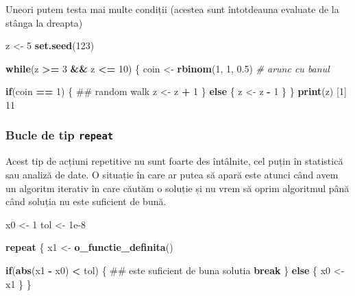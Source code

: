 \documentclass[]{article}
\newenvironment{Shaded}{\begin{snugshade}}{\end{snugshade}}
\newcommand{\KeywordTok}[1]{\textcolor[rgb]{0.13,0.29,0.53}{\textbf{#1}}}
\newcommand{\DecValTok}[1]{\textcolor[rgb]{0.00,0.00,0.81}{#1}}
\newcommand{\FloatTok}[1]{\textcolor[rgb]{0.00,0.00,0.81}{#1}}
\newcommand{\StringTok}[1]{\textcolor[rgb]{0.31,0.60,0.02}{#1}}
\newcommand{\CommentTok}[1]{\textcolor[rgb]{0.56,0.35,0.01}{\textit{#1}}}
\newcommand{\ControlFlowTok}[1]{\textcolor[rgb]{0.13,0.29,0.53}{\textbf{#1}}}
\newcommand{\OperatorTok}[1]{\textcolor[rgb]{0.81,0.36,0.00}{\textbf{#1}}}
\newcommand{\NormalTok}[1]{#1}
\newcounter{exo}[section]
\begin{document}
Uneori putem testa mai multe condiții (acestea sunt întotdeauna evaluate
de la stânga la dreapta)

\begin{Shaded}
\begin{Highlighting}[]
\NormalTok{z <-}\StringTok{ }\DecValTok{5}
\KeywordTok{set.seed}\NormalTok{(}\DecValTok{123}\NormalTok{)}

\ControlFlowTok{while}\NormalTok{(z }\OperatorTok{>=}\StringTok{ }\DecValTok{3} \OperatorTok{&&}\StringTok{ }\NormalTok{z }\OperatorTok{<=}\StringTok{ }\DecValTok{10}\NormalTok{) \{}
\NormalTok{        coin <-}\StringTok{ }\KeywordTok{rbinom}\NormalTok{(}\DecValTok{1}\NormalTok{, }\DecValTok{1}\NormalTok{, }\FloatTok{0.5}\NormalTok{) }\CommentTok{# arunc cu banul}
        
        \ControlFlowTok{if}\NormalTok{(coin }\OperatorTok{==}\StringTok{ }\DecValTok{1}\NormalTok{) \{  ## random walk}
\NormalTok{                z <-}\StringTok{ }\NormalTok{z }\OperatorTok{+}\StringTok{ }\DecValTok{1}
\NormalTok{        \} }\ControlFlowTok{else}\NormalTok{ \{}
\NormalTok{                z <-}\StringTok{ }\NormalTok{z }\OperatorTok{-}\StringTok{ }\DecValTok{1}
\NormalTok{        \} }
\NormalTok{\}}
\KeywordTok{print}\NormalTok{(z)}
\NormalTok{[}\DecValTok{1}\NormalTok{] }\DecValTok{11}
\end{Highlighting}
\end{Shaded}

\subsubsection{\texorpdfstring{Bucle de tip
\texttt{repeat}}{Bucle de tip repeat}}\label{bucle-de-tip-repeat}

Acest tip de acțiuni repetitive nu sunt foarte des întâlnite, cel puțin
în statistică sau analiză de date. O situație în care ar putea să apară
este atunci când avem un algoritm iterativ în care căutăm o soluție și
nu vrem să oprim algoritmul până când soluția nu este suficient de bună.

\begin{Shaded}
\begin{Highlighting}[]
\NormalTok{x0 <-}\StringTok{ }\DecValTok{1}
\NormalTok{tol <-}\StringTok{ }\FloatTok{1e-8}

\ControlFlowTok{repeat}\NormalTok{ \{}
\NormalTok{        x1 <-}\StringTok{ }\KeywordTok{o_functie_definita}\NormalTok{()}
        
        \ControlFlowTok{if}\NormalTok{(}\KeywordTok{abs}\NormalTok{(x1 }\OperatorTok{-}\StringTok{ }\NormalTok{x0) }\OperatorTok{<}\StringTok{ }\NormalTok{tol) \{  ## este suficient de buna solutia }
                \ControlFlowTok{break}
\NormalTok{        \} }\ControlFlowTok{else}\NormalTok{ \{}
\NormalTok{                x0 <-}\StringTok{ }\NormalTok{x1}
\NormalTok{        \} }
\NormalTok{\}}
\end{Highlighting}
\end{Shaded}
\end{document}
